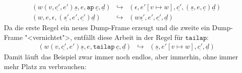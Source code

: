 %
\begin{eqnarray*}
   (w (v,\underline{c'}, e') \underline{s}, e, \mathtt{ap}~\underline{c}, \underline{d})
  &\hookrightarrow&
  (\epsilon, e'[v\mapsto w], \underline{c'}, (\underline{s}, e, \underline{c}) \underline{d})
  \\
  (w, e, \epsilon, (\underline{s'}, e', \underline{c'}) \underline{d})
  &\hookrightarrow&
  (w\underline{s'}, e', \underline{c'}, \underline{d})
\end{eqnarray*}
%
Da die erste Regel ein neues Dump-Frame erzeugt und die zweite ein
Dump-Frame "<vernichtet">, entfällt diese Arbeit in der Regel für
$\mathtt{tailap}$:
%
\begin{eqnarray*}
  (w (v,\underline{c'}, e') \underline{s}, e, \mathtt{tailap}~\underline{c}, \underline{d})
  &\hookrightarrow&
  (\underline{s}, e'[v \mapsto w], \underline{c'}, \underline{d})
\end{eqnarray*}
%
Damit läuft das Beispiel zwar immer noch endlos, aber immerhin, ohne
immer mehr Platz zu verbrauchen:
%
